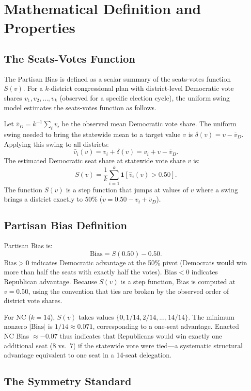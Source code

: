 \section{Mathematical Definition and Properties}
\label{sec:definition}

\subsection{The Seats-Votes Function}

The Partisan Bias is defined as a scalar summary of the seats-votes function $S(v)$.
For a $k$-district congressional plan with district-level Democratic vote shares
$v_1, v_2, \ldots, v_k$ (observed for a specific election cycle), the uniform
swing model estimates the seats-votes function as follows.

Let $\bar{v}_D = k^{-1}\sum_i v_i$ be the observed mean Democratic vote share.
The uniform swing needed to bring the statewide mean to a target value $v$ is
$\delta(v) = v - \bar{v}_D$. Applying this swing to all districts:
\[
\hat{v}_i(v) = v_i + \delta(v) = v_i + v - \bar{v}_D.
\]
The estimated Democratic seat share at statewide vote share $v$ is:
\[
S(v) = \frac{1}{k}\sum_{i=1}^k \mathbf{1}[\hat{v}_i(v) > 0.50].
\]
The function $S(v)$ is a step function that jumps at values of $v$ where a
swing brings a district exactly to 50\% ($v = 0.50 - v_i + \bar{v}_D$).

\subsection{Partisan Bias Definition}

Partisan Bias is:
\[
\text{Bias} = S(0.50) - 0.50.
\]
$\text{Bias} > 0$ indicates Democratic advantage at the 50\% pivot (Democrats
would win more than half the seats with exactly half the votes). $\text{Bias} < 0$
indicates Republican advantage. Because $S(v)$ is a step function, Bias is computed
at $v = 0.50$, using the convention that ties are broken by the observed order of
district vote shares.

For NC ($k=14$), $S(v)$ takes values $\{0, 1/14, 2/14, \ldots, 14/14\}$.
The minimum nonzero $|\text{Bias}|$ is $1/14 \approx 0.071$, corresponding
to a one-seat advantage. Enacted NC Bias $\approx -0.07$ thus indicates that
Republicans would win exactly one additional seat (8 vs.\ 7) if the statewide
vote were tied---a systematic structural advantage equivalent to one seat in a
14-seat delegation.

\subsection{The Symmetry Standard}

